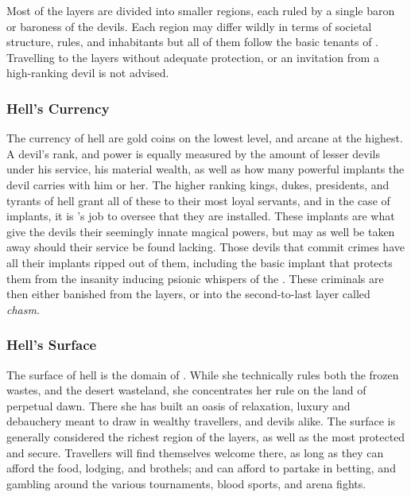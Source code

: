 Most of the layers are divided into smaller regions, each ruled by a single
baron or baroness of the devils. Each region may differ wildly in terms of
societal structure, rules, and inhabitants but all of them follow the basic
tenants of . Travelling to the layers without adequate
protection, or an invitation from a high-ranking devil is not advised.

\subsubsection{Hell's Currency}

The currency of hell are gold coins on the lowest level, and arcane
 at the highest. A devil's rank, and power is equally
measured by the amount of lesser devils under his service, his material
wealth, as well as how many powerful implants the devil carries with him
or her. The higher ranking kings, dukes, presidents, and tyrants of hell
grant all of these to their most loyal servants, and in the case of implants,
it is 's job to oversee that they are installed. These
implants are what give the devils their seemingly innate magical powers,
but may as well be taken away should their service be found lacking. Those
devils that commit crimes have all their implants ripped out of them,
including the basic implant that protects them from the insanity inducing
psionic whispers of the . These criminals are then either
banished from the layers, or into the second-to-last layer called
\emph{chasm}.

\subsubsection{Hell's Surface}
\label{sec:Hells Surface}

The surface of hell is the domain of . While she
technically rules both the frozen wastes, and the desert wasteland, she
concentrates her rule on the land of perpetual dawn. There she has built an
oasis of relaxation, luxury and debauchery meant to draw in wealthy
travellers, and devils alike. The surface is generally considered the richest
region of the layers, as well as the most protected and secure. Travellers
will find themselves welcome there, as long as they can afford the food,
lodging, and brothels; and can afford to partake in betting, and gambling
around the various tournaments, blood sports, and arena fights.

